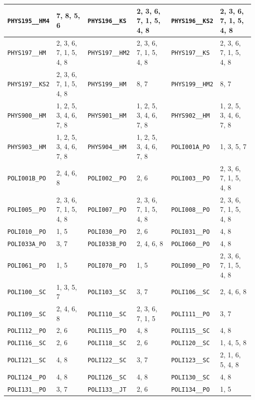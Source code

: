 \begin{longtable}{|l|l||l|l||l|l|}
    \verb|PHYS195__HM4| & 7, 8, 5, 6 & \verb|PHYS196__KS| & 2, 3, 6, 7, 1, 5, 4, 8 & \verb|PHYS196__KS2| & 2, 3, 6, 7, 1, 5, 4, 8\\\hline
    \verb|PHYS197__HM| & 2, 3, 6, 7, 1, 5, 4, 8 & \verb|PHYS197__HM2| & 2, 3, 6, 7, 1, 5, 4, 8 & \verb|PHYS197__KS| & 2, 3, 6, 7, 1, 5, 4, 8\\\hline
    \verb|PHYS197__KS2| & 2, 3, 6, 7, 1, 5, 4, 8 & \verb|PHYS199__HM| & 8, 7 & \verb|PHYS199__HM2| & 8, 7\\\hline
    \verb|PHYS900__HM| & 1, 2, 5, 3, 4, 6, 7, 8 & \verb|PHYS901__HM| & 1, 2, 5, 3, 4, 6, 7, 8 & \verb|PHYS902__HM| & 1, 2, 5, 3, 4, 6, 7, 8\\\hline
    \verb|PHYS903__HM| & 1, 2, 5, 3, 4, 6, 7, 8 & \verb|PHYS904__HM| & 1, 2, 5, 3, 4, 6, 7, 8 & \verb|POLI001A_PO| & 1, 3, 5, 7\\\hline
    \verb|POLI001B_PO| & 2, 4, 6, 8 & \verb|POLI002__PO| & 2, 6 & \verb|POLI003__PO| & 2, 3, 6, 7, 1, 5, 4, 8\\\hline
    \verb|POLI005__PO| & 2, 3, 6, 7, 1, 5, 4, 8 & \verb|POLI007__PO| & 2, 3, 6, 7, 1, 5, 4, 8 & \verb|POLI008__PO| & 2, 3, 6, 7, 1, 5, 4, 8\\\hline
    \verb|POLI010__PO| & 1, 5 & \verb|POLI030__PO| & 2, 6 & \verb|POLI031__PO| & 4, 8\\\hline
    \verb|POLI033A_PO| & 3, 7 & \verb|POLI033B_PO| & 2, 4, 6, 8 & \verb|POLI060__PO| & 4, 8\\\hline
    \verb|POLI061__PO| & 1, 5 & \verb|POLI070__PO| & 1, 5 & \verb|POLI090__PO| & 2, 3, 6, 7, 1, 5, 4, 8\\\hline
    \verb|POLI100__SC| & 1, 3, 5, 7 & \verb|POLI103__SC| & 3, 7 & \verb|POLI106__SC| & 2, 4, 6, 8\\\hline
    \verb|POLI109__SC| & 2, 4, 6, 8 & \verb|POLI110__SC| & 2, 3, 6, 7, 1, 5 & \verb|POLI111__PO| & 3, 7\\\hline
    \verb|POLI112__PO| & 2, 6 & \verb|POLI115__PO| & 4, 8 & \verb|POLI115__SC| & 4, 8\\\hline
    \verb|POLI116__SC| & 2, 6 & \verb|POLI118__SC| & 2, 6 & \verb|POLI120__SC| & 1, 4, 5, 8\\\hline
    \verb|POLI121__SC| & 4, 8 & \verb|POLI122__SC| & 3, 7 & \verb|POLI123__SC| & 2, 1, 6, 5, 4, 8\\\hline
    \verb|POLI124__PO| & 4, 8 & \verb|POLI126__SC| & 4, 8 & \verb|POLI130__SC| & 4, 8\\\hline
    \verb|POLI131__PO| & 3, 7 & \verb|POLI133__JT| & 2, 6 & \verb|POLI134__PO| & 1, 5\\\hline

\end{longtable}
